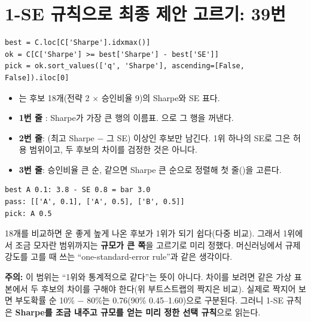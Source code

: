 \section{1-SE 규칙으로 최종 제안 고르기: 39번}
\begin{lstlisting}
best = C.loc[C['Sharpe'].idxmax()]
ok = C[C['Sharpe'] >= best['Sharpe'] - best['SE']]
pick = ok.sort_values(['q', 'Sharpe'], ascending=[False, False]).iloc[0]
\end{lstlisting}
\begin{itemize}[leftmargin=*]
\item {}는 후보 18개(전략 2 \ensuremath{\times} 승인비율 9)의 Sharpe와 SE 표다.
\item \textbf{1번 줄} : Sharpe가 가장 큰 행의 이름표. 으로 그 행을 꺼낸다.
\item \textbf{2번 줄}: (최고 Sharpe $-$ 그 SE) 이상인 후보만 남긴다. 1위 하나의 SE로 그은 허용 범위이고, 두 후보의 차이를 검정한 것은 아니다.
\item \textbf{3번 줄}: 승인비율 큰 순, 같으면 Sharpe 큰 순으로 정렬해 첫 줄()을 고른다.
\end{itemize}
\begin{workout}
\begin{lstlisting}[style=out]
best A 0.1: 3.8 - SE 0.8 = bar 3.0
pass: [['A', 0.1], ['A', 0.5], ['B', 0.5]]
pick: A 0.5
\end{lstlisting}
\end{workout}
\begin{whybox}
18개를 비교하면 운 좋게 높게 나온 후보가 1위가 되기 쉽다(다중 비교). 그래서 1위에서 조금 모자란 범위까지는 \textbf{규모가 큰 쪽}을 고르기로 미리 정했다. 머신러닝에서 규제 강도를 고를 때 쓰는 ``one-standard-error rule''과 같은 생각이다.

\textbf{주의:} 이 범위는 ``1위와 통계적으로 같다''는 뜻이 아니다. 차이를 보려면 같은 가상 표본에서 두 후보의 차이를 구해야 한다(위 부트스트랩의 짝지은 비교). 실제로 짝지어 보면 부도확률 순 10\% $-$ 80\%는 0.76(90\% 0.45--1.60)으로 구분된다. 그러니 1-SE 규칙은 \textbf{Sharpe를 조금 내주고 규모를 얻는 미리 정한 선택 규칙}으로 읽는다.
\end{whybox}

